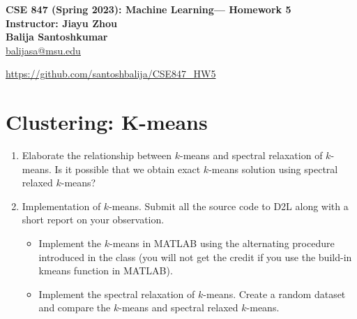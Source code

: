 \documentclass[11pt]{article}
\begin{document}
\thispagestyle {empty}

\newcommand{\lsp}[1]{\large\renewcommand{\baselinestretch}{#1}\normalsize}
\newcommand{\hsp}{\hspace{.2in}}
\newcommand{\comment}[1]{}
\newtheorem{thm}{Theorem}[section]
\newtheorem{lem}{Lemma}[section]
\newtheorem{cor}{Corollary}[section]
\newtheorem{prop}{Proposition}[section]
\newtheorem{problem}{Problem}[section]

\newcommand{\R}{{\rm\hbox{I\kern-.15em R}}}
\newcommand{\IR}{{\rm\hbox{I\kern-.15em R}}}
\newcommand{\IN}{{\rm\hbox{I\kern-.15em N}}}
\newcommand{\IZ}{{\sf\hbox{Z\kern-.40em Z}}}
\newcommand{\IS}{{\rm\hbox{S\kern-.45em S}}}
\newcommand{\Real}{I\!\!R}


\newcommand{\linesep}{\vspace{.2cm}\hrule\vspace{0.2cm}}
\newcommand{\categorysep}{\vspace{0.5cm}}
\newcommand{\entrysep}{\vspace{0cm}}

\newcommand{\category}[1]{\categorysep
                  \noindent {\bf \large #1}
              \linesep}

\pagestyle{empty}

\begin{center}
{\large \textbf{CSE 847 (Spring 2023): Machine Learning--- Homework 5\\
 Instructor: Jiayu Zhou \\
  Balija Santoshkumar}} \\
\href{mailto:balijasa@msu.edu}{balijasa@msu.edu}

\href{https://github.com/santoshbalija/CSE847_HW5}{https://github.com/santoshbalija/CSE847\_HW5}
\end{center}
\section{ Clustering: K-means}

\begin{enumerate}
\item  Elaborate the relationship between $k$-means and spectral relaxation of $k$-means. Is it possible that we obtain exact $k$-means solution using spectral relaxed $k$-means?
\item Implementation of $k$-means. Submit all the source code to D2L along with a short report on your observation.
\begin{itemize}
	\item Implement the $k$-means in MATLAB using the alternating procedure introduced in the class (you will not get the credit if you use the build-in kmeans function in MATLAB).
\item  Implement the spectral relaxation of $k$-means. Create a random dataset and compare the $k$-means and spectral relaxed $k$-means.
\end{itemize}
\end{enumerate}
\end{document}
